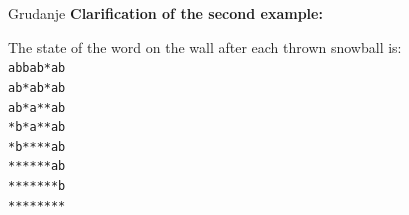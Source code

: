 \begin{statement}[
  problempoints=70,
  timelimit=1 second,
  memorylimit=512 MiB,
]{Grudanje}
\textbf{Clarification of the second example:}

The state of the word on the wall after each thrown snowball is:\\
 \texttt{abbab*ab} \\
 \texttt{ab*ab*ab} \\
 \texttt{ab*a**ab} \\
 \texttt{*b*a**ab} \\
 \texttt{*b****ab} \\
 \texttt{******ab} \\
 \texttt{*******b} \\
 \texttt{********}

\end{statement}

